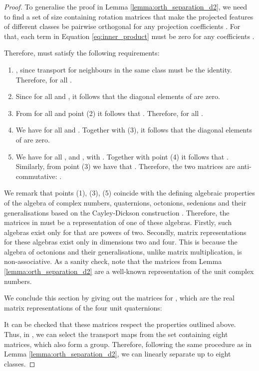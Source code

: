 \documentclass{article}
\begin{document}
\OrthSeparation*
\begin{proof}
To generalise the proof in Lemma \ref{lemma:orth_separation_d2}, we need to find a set  of size  containing rotation matrices that make the projected features of different classes be pairwise orthogonal for any projection coefficients . For that, each term in Equation \ref{eq:inner_product} must be zero for any coefficients . 

Therefore,  must satisfy the following requirements:
\begin{enumerate}
    \item , since transport for neighbours in the same class must be the identity. Therefore,  for all .  
    \item Since  for all  and , it follows that the diagonal elements of  are zero. 
    \item From  for all  and point (2) it follows that . Therefore,  for all . 
    \item We have  for all  and . Together with (3), it follows that the diagonal elements of  are zero. 
    \item We have  for all , and , with . Together with point (4) it follows that . Similarly, from point (3) we have that . Therefore, the two matrices are anti-commutative: .
\end{enumerate}

We remark that points (1), (3), (5) coincide with the defining algebraic properties of the algebra of complex numbers, quaternions, octonions, sedenions and their generalisations based on the Cayley-Dickson construction \citep{schafer2017introduction}. Therefore, the matrices in  must be a representation of one of these algebras. Firstly, such algebras exist only for  that are powers of two. Secondly, matrix representations for these algebras exist only in dimensions two and four. This is because the algebra of octonions and their generalisations, unlike matrix multiplication, is non-associative. As a sanity check, note that the matrices  from Lemma \ref{lemma:orth_separation_d2} are a well-known representation of the unit complex numbers.  

We conclude this section by giving out the matrices for , which are the real matrix representations of the four unit quaternions:

It can be checked that these matrices respect the properties outlined above. Thus, in , we can select the transport maps from the set  containing eight matrices, which also form a group. Therefore, following the same procedure as in Lemma \ref{lemma:orth_separation_d2}, we can linearly separate up to eight classes.  
\end{proof}
\end{document}

